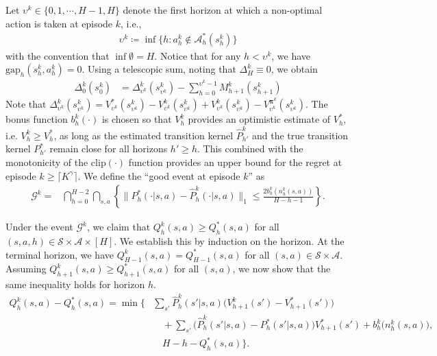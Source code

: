 \documentclass[11pt]{article}
\newcommand{\pii}{\boldsymbol{\pi}}
\newcommand{\Dvs}{\Delta}
\newcommand{\Dvsm}{M}
\newcommand{\clip}{\mathrm{clip}}
\newcommand{\gap}{\mathrm{gap}}
\begin{document}
Let $\upsilon^k \in \{0,1,\cdots,H-1,H\}$ denote the first horizon at which a non-optimal action is taken at episode $k$, i.e.,
\begin{align*}
    \upsilon^k \coloneqq \inf \{h: a_h^k \notin \mathcal{A}^*_h(s_h^k)\} 
\end{align*}
with the convention that $\inf\emptyset = H$. Notice that for any $h< \upsilon^k $, we have $\gap_h(s_h^k,a_h^k) = 0$. Using a telescopic sum, noting that $\Dvs^k_H\equiv 0$, we obtain
\begin{align}
    \Dvs^k_0(s_0^k) &= \Dvs^k_{\upsilon^k}(s_{\upsilon^k}^k) - \sum_{h=0}^{{\upsilon^k}-1}\Dvsm^k_{h+1}(s_{h+1}^k) \label{eq:Dvs-equality}
\end{align}
Note that $\Dvs^k_{\upsilon^k}(s_{\upsilon^k}^k) = V_{\upsilon^k}^{*}(s_{\upsilon^k}^k) - V_{\upsilon^k}^{k}(s_{\upsilon^k}^k) + V_{\upsilon^k}^{k}(s_{\upsilon^k}^k) -V_{\upsilon^k}^{\pii^k}(s_{\upsilon^k}^k)$. The bonus function $b_h^k(\cdot)$ is chosen so that $V_h^k$ provides an {optimistic estimate} of $V_h^*$, i.e. $V_h^k \geq V_h^*$, as long as the estimated transition kernel $\hat{P}_{h'}^k$ and the true transition kernel $P_{h'}^*$ remain close 
for all horizons $h' \geq h$. This combined with the monotonicity of the $\clip(\cdot)$ function provides an upper bound for the regret at episode $k\geq \lceil K^\gamma \rceil$. We define the ``good event at episode $k$'' as 
\begin{align*}
\mathcal{G}^k =& \bigcap_{h=0}^{H-2}\bigcap_{s,a}\left\{\|P_h^*(\cdot|s,a)-\hat P_h^k(\cdot|s,a)\|_1 \leq \frac{2b_h^k(n_h^k(s,a))}{H-h-1} \right\}.
\end{align*}

Under the event $\mathcal{G}^k$, we claim that $Q_h^k(s,a) \geq  Q_h^*(s,a)$ for all $(s,a,h)\in\mathcal{S}\times\mathcal{A}\times[H]$. We establish this by induction on the horizon. At the terminal horizon, we have $Q_{H-1}^k(s,a) = Q_{H-1}^*(s,a)$ for all $(s,a) \in \mathcal{S} \times \mathcal{A}$. 
Assuming $Q_{h+1}^k(s,a) \ge Q_{h+1}^*(s,a)$ for all $(s,a)$, we now show that the same inequality holds for horizon $h$.
\begin{align*}
    Q_h^k(s,a) - Q_h^*(s,a)
    = \min\Bigg\{ &
    \sum_{s'} \hat P_h^k(s'|s,a)\big(V_{h+1}^k(s') - V_{h+1}^*(s')\big) \\
    &\quad+ \sum_{s'} \big(\hat P_h^k(s'|s,a) - P_h^*(s'|s,a)\big)V_{h+1}^*(s') 
    + b_h^k\big(n_h^k(s,a)\big), \\
    &\quad H - h - Q_h^*(s,a)\Bigg\}.
\end{align*}
\end{document}
